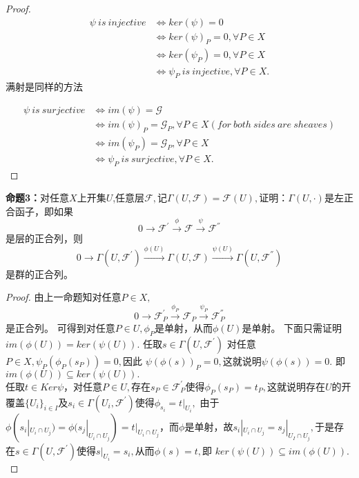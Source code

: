 \documentclass[UTF8]{article}
\begin{document}
\begin{proof}
	
	\[ \begin{split}
	\psi \ is\  injective&\Longleftrightarrow ker(\psi)=0\\
	 &	\Longleftrightarrow ker(\psi)_{P}=0,\forall P\in X\\
	 &	\Longleftrightarrow ker(\psi_{P})=0,\forall P\in X\\
	 &\Longleftrightarrow 
	 \psi_{P} \ is\ injective,\forall P\in X.
	\end{split} \]
满射是同样的方法

	
\[ \begin{split}
\psi \ is\ surjective&\Longleftrightarrow im(\psi)=\mathcal{G}\\
&	\Longleftrightarrow im(\psi)_{P}=\mathcal{G}_{P},\forall P\in X(for \ both \ sides\ are\ sheaves)\\
&	\Longleftrightarrow im(\psi_{P})=\mathcal{G}_{P},\forall P\in X\\
&\Longleftrightarrow 
\psi_{P} \ is\ surjective,\forall P\in X.
\end{split} \]

\end{proof}
\textbf{命题3：}对任意$X$上开集$U$,任意层$\mathcal{F},$记$\Gamma(U,\mathcal{F})=\mathcal{F}(U),$证明：$\Gamma(U,\cdot)$是左正合函子，即如果
$$
0\rightarrow\mathcal{F}^{'}\stackrel{\phi}{\rightarrow} \mathcal{F}\stackrel{\psi}{\rightarrow} \mathcal{F}^{''}
$$是层的正合列，则
$$0\rightarrow \Gamma(U,\mathcal{F}^{'})\stackrel{\phi(U)}{\longrightarrow}\Gamma(U,\mathcal{F})\stackrel{\psi(U)}{\longrightarrow}\Gamma(U,\mathcal{F}^{''})$$
是群的正合列。\\
\begin{proof}
	由上一命题知对任意$P\in X,$
	$$
	0\rightarrow\mathcal{F}^{'}_{P}\stackrel{\phi_{P}}{\rightarrow} \mathcal{F}_{P}\stackrel{\psi_{P}}{\rightarrow} \mathcal{F}^{''}_{P}
	$$
	是正合列。
可得到对任意$P\in U,\phi_{P}$是单射，从而$\phi(U)$是单射。
下面只需证明$im(\phi(U))=ker(\psi(U)).$
任取$s\in \Gamma(U,\mathcal{F}^{'})$
对任意$P\in X,\psi_{P}(\phi_{P}(s_{P}))=0,$因此
$\psi(\phi(s))_{P}=0,$这就说明$\psi(\phi(s))=0.$
即$im(\phi(U))\subseteq ker(\psi(U)).$\\
任取$t\in Ker\psi$，对任意$P\in U,$存在$s_{P}\in \mathcal{F}^{'}_{P}$使得$\phi_{P}(s_{P})=t_{P},$这就说明存在$U$的开覆盖$\{U_{i}\}_{i\in I}$及$s_{i}\in \Gamma(U_{i},\mathcal{F}^{'})$使得$\phi_{s_{i}}=t|_{U_{i}},$
由于$\phi(s_{i}|_{U_{i}\cap U_{j}})=\phi(s_{j}|_{U_{i}\cap U_{j}})=t|_{U_{i}\cap U_{j}}$，而$\phi$是单射，故$s_{i}|_{U_{i}\cap U_{j}}=s_{j}|_{U_{I}\cap  U_{j}},$于是存在$s\in \Gamma(U,\mathcal{F}^{'})$使得$s|_{U_{i}}=s_{i},$从而$\phi(s)=t,$即
$ker(\psi(U))\subseteq im(\phi(U)).$\\
\end{proof}
\end{document}
